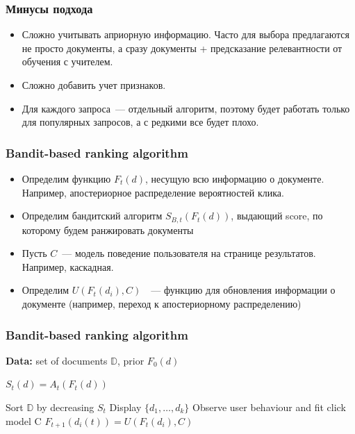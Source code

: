 \documentclass[xetex,mathserif,serif,table]{beamer}
\begin{document}
\begin{frame}
\frametitle{Минусы подхода}
\begin{itemize}
\item Сложно учитывать априорную информацию. Часто для выбора предлагаются не просто документы, а сразу документы + предсказание релевантности от обучения с учителем.
\item Сложно добавить учет признаков.
\item Для каждого запроса — отдельный алгоритм, поэтому будет работать только для популярных запросов, а с редкими все будет плохо.
\end{itemize}

\end{frame}



\begin{frame}
\frametitle{Bandit-based ranking algorithm}

\begin{itemize}
\item Определим функцию $F_t(d)$, несущую всю информацию о документе. Например, апостериорное распределение вероятностей клика. 
\item Определим бандитский алгоритм $S_{B, t}(F_t(d))$, выдающий score, по которому будем ранжировать документы
\item Пусть $C$ — модель поведение пользователя на странице результатов. Например, каскадная.
\item  Определим $U(F_t(d_i), C)$  — функцию для обновления информации о документе (например, переход к апостериорному распределению)
\end{itemize}

\end{frame}

\begin{frame}
\frametitle{Bandit-based ranking algorithm}

\begin{algorithmic}
\State \textbf{Data: } set of documents $\mathbb{D}$, prior $F_0(d)$
  
    \State $S_t(d) = A_t(F_t(d))$
  \EndFor
  
  \State Sort $\mathbb{D}$ by decreasing $S_t$
  \State Display $\{d_1, …, d_k\}$
  \State Observe user behaviour and fit click model C   
    \State $F_{t+1}(d_i(t)) = U(F_t(d_i), C)$
  \EndFor
\EndFor 
\end{algorithmic}

\end{frame}
\end{document}
